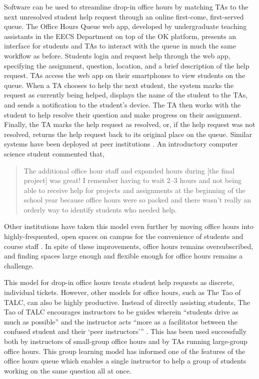 Software can be used to streamline drop-in office hours by matching TAs to the next unresolved student help request through an online first-come, first-served queue. The Office Hours Queue web app, developed by undergraduate teaching assistants in the EECS Department on top of the OK platform, presents an interface for students and TAs to interact with the queue in much the same workflow as before. Students login and request help through the web app, specifying the assignment, question, location, and a brief description of the help request. TAs access the web app on their smartphones to view students on the queue. When a TA chooses to help the next student, the system marks the request as currently being helped, displays the name of the student to the TAs, and sends a notification to the student's device. The TA then works with the student to help resolve their question and make progress on their assignment. Finally, the TA marks the help request as resolved, or, if the help request was not resolved, returns the help request back to its original place on the queue. Similar systems have been deployed at peer institutions \cite{Smith:2017, MacWilliam:2013}. An introductory computer science student commented that,
\begin{quote}
    The additional office hour staff and expanded hours during [the final project] was great! I remember having to wait 2--3 hours and not being able to receive help for projects and assignments at the beginning of the school year because office hours were so packed and there wasn't really an orderly way to identify students who needed help.
\end{quote}
Other institutions have taken this model even further by moving office hours into highly-frequented, open spaces on campus for the convenience of students and course staff \cite{MacWilliam:2013}. In spite of these improvements, office hours remains oversubscribed, and finding spaces large enough and flexible enough for office hours remains a challenge.

This model for drop-in office hours treats student help requests as discrete, individual tickets. However, other models for office hours, such as The Tao of TALC, can also be highly productive. Instead of directly assisting students, The Tao of TALC encourages instructors to be guides wherein ``students drive as much as possible'' and the instructor acts ``more as a facilitator between the confused student and their `peer instructors'{}'' \cite{Astrachan:2007}. This has been used successfully both by instructors of small-group office hours and by TAs running large-group office hours. This group learning model has informed one of the features of the office hours queue which enables a single instructor to help a group of students working on the same question all at once.

